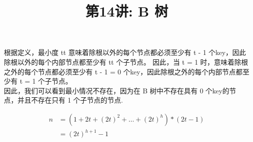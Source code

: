 \documentclass[a4paper, justified]{tufte-handout}
\title{第14讲: B 树}
\date{\zhtoday} %
\begin{document}
\maketitle
\noplagiarism %
\begin{abstract}
\end{abstract}
\beginrequired

\begin{problem}[TC 18.1-1]
\end{problem}

\begin{solution}
  根据定义，最小度 tt 意味着除根以外的每个节点都必须至少有 t - 1 个key，因此除根以外的每个内部节点都至少有 tt 个子节点。 因此，当 t = 1 时，意味着除根之外的每个节点都必须至少有 t - 1 = 0 个key，因此除根之外的每个内部节点都至少有 t = 1 个子节点。\\
  因此，我们可以看到最小情况不存在，因为在 B 树中不存在具有 0 个key的节点，并且不存在只有 1 个子节点的节点.
\end{solution}

\begin{problem}[TC 18.1-4]
\end{problem}

\begin{solution}
  $$
    \begin{aligned}
      n & = (1 + 2t + (2t)^2 + … + (2t)^h) * (2t - 1) \\
        & = (2t)^{h + 1} - 1
    \end{aligned}
  $$
\end{solution}

\begin{problem}[TC 18.2-3]
\end{problem}
\end{document}
